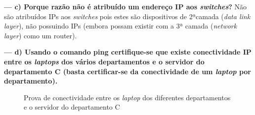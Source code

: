 \documentclass[a4paper]{article}
\begin{document}
\textbf{--- c) Porque razão não é atribuído um endereço IP aos \textit{switches}?}\newline
Não  são atribuídos IPs aos \textit{switches} pois estes são dispositivos de 2ªcamada (\textit{data link layer}), não possuindo IPs (embora possam existir com a 3ª camada (\textit{network layer}) como um router).


\newpage
\textbf{--- d) Usando o comando \textbf{ping} certifique-se que existe conectividade IP entre os \textit{laptops} dos vários departamentos e o servidor do departamento C (basta certificar-se da conectividade de um \textit{laptop} por departamento).}\newline
\begin{figure}[h]%
    \centering
    \qquad
    \qquad
    \caption{Prova de conectividade entre os \textit{laptop} dos diferentes departamentos e o servidor do departamento C}%
    \label{fig:example}%
\end{figure}
\end{document}
